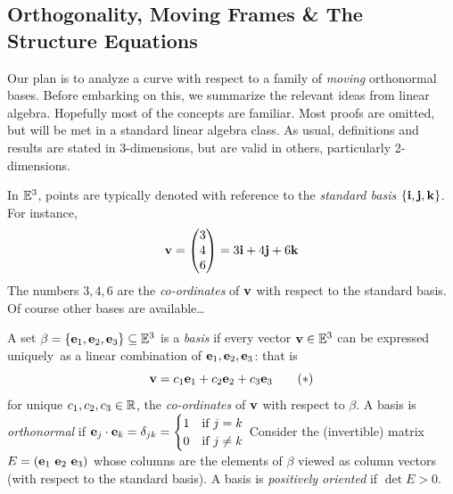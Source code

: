 \clearpage



\subsection{Orthogonality, Moving Frames \& The Structure Equations}\label{sec:orth}

Our plan is to analyze a curve with respect to a family of \emph{moving} orthonormal bases. Before embarking on this, we summarize the relevant ideas from linear algebra. Hopefully most of the concepts are familiar. Most proofs are omitted, but will be met in a standard linear algebra class. As usual, definitions and results are stated in 3-dimensions, but are valid in others, particularly 2-dimensions.\medbreak

In $\mathbb{E}^3$, points are typically denoted with reference to the \emph{standard basis} $\{{\mathbf{i}},{\mathbf{j}},{\mathbf{k}}\}$. For instance,
\[
	{\mathbf{v}}=\begin{pmatrix}3\\4\\6\end{pmatrix}=3{\mathbf{i}}+4{\mathbf{j}}+6{\mathbf{k}}
\]
The numbers $3,4,6$ are the \emph{co-ordinates} of ${\mathbf{v}}$ with respect to the standard basis. Of course other bases are available\ldots

\begin{defn}{}{}
	A set $\beta=\{{\mathbf{e}}_1,{\mathbf{e}}_2,{\mathbf{e}}_3\}\subseteq\mathbb{E}^3$ is a \emph{basis} if every vector ${\mathbf{v}}\in\mathbb{E}^3$ can be expressed uniquely\footnotemark\ as a linear combination of ${\mathbf{e}}_1,{\mathbf{e}}_2,{\mathbf{e}}_3$: that is
	\[
		{\mathbf{v}}=c_1{\mathbf{e}}_1+c_2{\mathbf{e}}_2+c_3{\mathbf{e}}_3\tag{$\ast$}
	\]
	for unique $c_1,c_2,c_3\in\mathbb{R}$, the \emph{co-ordinates} of ${\mathbf{v}}$ with respect to $\beta$.\smallbreak
	A basis is \emph{orthonormal} if ${\mathbf{e}}_j\cdot{\mathbf{e}}_k=\delta_{jk}=
	\begin{cases}
		1&\text{if }j=k\\
		0&\text{if }j\neq k
	\end{cases}
	$\smallbreak
	Consider the (invertible) matrix $E=({\mathbf{e}}_1\ {\mathbf{e}}_2\ {\mathbf{e}}_3)$ whose columns are the elements of $\beta$ viewed as column vectors (with respect to the standard basis). A basis is \emph{positively oriented} if $\det E>0$.
\end{defn}




